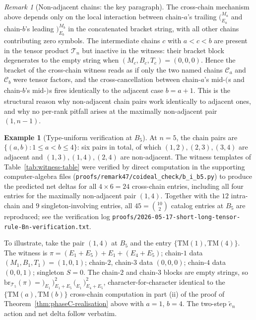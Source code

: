 \documentclass[11pt]{article}
\theoremstyle{definition}
\newtheorem{example}[theorem]{Example}
\theoremstyle{remark}
\newtheorem{remark}[theorem]{Remark}
\newcommand{\TM}{\mathrm{TM}}
\newcommand{\Cmid}{\mathcal{C}}
\newcommand{\TT}{\mathcal{T}}
\newcommand{\br}{\mathrm{br}}
\newcommand{\labr}[1]{{)}_{#1}}
\newcommand{\labl}[1]{{(}_{#1}}
\begin{document}
\begin{remark}[Non-adjacent chains: the key paragraph]\label{rmk:non-adjacent-key}
The cross-chain mechanism above depends only on the local interaction between
chain-$a$'s trailing $\labl{E_a}^{M_a}$ and chain-$b$'s leading $\labr{E_b}^{M_b}$
in the concatenated bracket string, with all other chains contributing zero
symbols. The intermediate chains $c$ with $a < c < b$ are present in the tensor
product $\TT_n$ but inactive in the witness: their bracket block degenerates to
the empty string when $(M_c, B_c, T_c) = (0, 0, 0)$. Hence the bracket of the
cross-chain witness reads as if only the two named chains $\Cmid_a$ and $\Cmid_b$
were tensor factors, and the cross-cancellation between chain-$a$'s mid-$\labl{}$s
and chain-$b$'s mid-$\labr{}$s fires identically to the adjacent case $b = a + 1$.
This is the structural reason why non-adjacent chain pairs work identically to
adjacent ones, and why no per-rank pitfall arises at the maximally non-adjacent
pair $(1, n-1)$.
\end{remark}

\begin{example}[Type-uniform verification at $B_5$]\label{ex:B5-verification}
At $n = 5$, the chain pairs are $\{(a, b) : 1 \leq a < b \leq 4\}$: six pairs in
total, of which $(1, 2), (2, 3), (3, 4)$ are adjacent and $(1, 3), (1, 4), (2, 4)$
are non-adjacent. The witness templates of Table~\ref{tab:witness-table} were
verified by direct computation in the supporting computer-algebra files
(\texttt{proofs/remark47/coideal\_check/b\_i\_b5.py}) to produce the predicted
net deltas for all $4 \times 6 = 24$ cross-chain entries, including all four
entries for the maximally non-adjacent pair $(1, 4)$. Together with the $12$
intra-chain and $9$ singleton-involving entries, all $45 = \binom{10}{2}$
catalog entries at $B_5$ are reproduced; see the verification log
\texttt{proofs/2026-05-17-short-long-tensor-rule-Bn-verification.txt}.

To illustrate, take the pair $(1, 4)$ at $B_5$ and the entry $\{\TM(1), \TM(4)\}$.
The witness is $\pi = (E_1 + E_5) + E_1 + (E_4 + E_5)$; chain-$1$ data
$(M_1, B_1, T_1) = (1, 0, 1)$; chain-$2$, chain-$3$ data $(0, 0, 0)$; chain-$4$
data $(0, 0, 1)$; singleton $S = 0$. The chain-$2$ and chain-$3$ blocks are
empty strings, so $\br_{\TT_5}(\pi) = \labr{E_1}\, \labr{E_1 + E_5}^{2}\,
\labl{E_1}\, \labr{E_4 + E_5}^{2}$, character-for-character identical to the
$\{\TM(a), \TM(b)\}$ cross-chain computation in part (ii) of the proof of
Theorem~\ref{thm:phaseC-realisation} above with $a = 1$, $b = 4$. The two-step
$\tilde e_n$ action and net delta follow verbatim.
\end{example}
\end{document}
